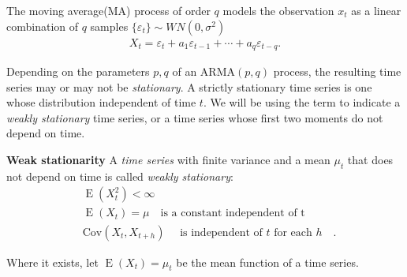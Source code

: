   The moving average(MA) process of order $q$ models
  the observation $x_t$ as a linear combination of $q$
  samples $\{ \varepsilon_t \} \sim WN(0, \sigma^2)$  
  \begin{align}
      X_t = \varepsilon_t + a_1 \varepsilon_{t-1} + 
    \cdots + a_q \varepsilon_{t-q}.
  \end{align}

  Depending on the parameters $p,q$ of an 
  ARMA$(p,q)$ process, 
  the resulting time series may or may not be 
   \textit{stationary}. A strictly stationary 
   time series is one 
   whose distribution independent of time $t$. 
   We will be using the term to indicate 
   a \textit{weakly stationary} time series, or 
   a time series whose first two moments do not 
   depend on time.
  \begin{defn}\label{def:stationary}{\textbf{Weak stationarity} }
   A  \textit{time series} with finite variance and a 
  mean $\mu_t$ that does not depend on time is called 
   \textit{weakly stationary}: 
  \begin{align*}
    &\mathop{E}(X_t^2) < \infty \\
    &\mathop{E}(X_t)  = \mu \hspace{1em} \text{is a constant 
    independent of t }\hspace{1em} \\
    &\text{Cov}(X_t, X_{t+ h }) \hspace{1em}\text{ is independent
    of } t \text{ for each } h\hspace{1em}.
  \end{align*}   
  \end{defn}
   Where it exists, let $\mathop{E}(X_t)  = \mu_{t}$ be the mean function of a time series.
